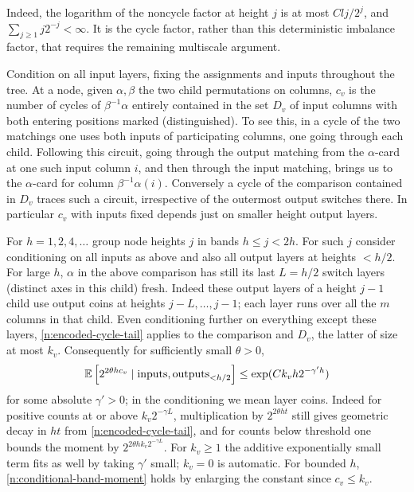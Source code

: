 Indeed, the logarithm of the noncycle factor at height $j$ is at
most $Clj/2^j$, and $\sum_{j\ge1}j2^{-j}<\infty$.
It is the cycle factor, rather than this deterministic imbalance
factor, that requires the remaining multiscale argument.

Condition on all input layers, fixing the assignments and inputs throughout the tree. At a node, given \(\alpha,\beta\) the two child permutations on columns, \(c_v\) is the number of cycles of \(\beta^{-1}\alpha\) entirely contained in the set \(D_v\) of input columns with both entering positions marked (distinguished). To see this, in a cycle of the two matchings one uses both inputs of participating columns, one going through each child. Following this circuit, going through the output matching from the \(\alpha\)-card at one such input column \(i\), and then through the input matching, brings us to the \(\alpha\)-card for column \(\beta^{-1}\alpha(i)\). Conversely a cycle of the comparison contained in \(D_v\) traces such a circuit, irrespective of the outermost output switches there. In particular \(c_v\) with inputs fixed depends just on smaller height output layers.

For \(h=1,2,4,\ldots\) group node heights \(j\) in bands \(h\le j<2h\). For such \(j\) consider conditioning on all inputs as above and also all output layers at heights \(<h/2\). For large \(h\), \(\alpha\) in the above comparison has still its last \(L=h/2\) switch layers (distinct axes in this child) fresh. Indeed these output layers of a height \(j-1\) child use output coins at heights \(j-L,\ldots,j-1\); each layer runs over all the \(m\) columns in that child. Even conditioning further on everything except these layers, \eqref{n:encoded-cycle-tail} applies to the comparison and \(D_v\), the latter of size at most \(k_v\). Consequently for sufficiently small \(\theta>0\),
\begin{equation}
\mathbb E\left[2^{2\theta h c_v}\mid {\rm inputs}, {\rm outputs}_{<h/2}\right]\le
\exp(C k_v h 2^{-\gamma' h})
\label{n:conditional-band-moment}
\end{equation}
for some absolute \(\gamma'>0\); in the conditioning we mean layer coins. Indeed for positive counts at or above \(k_v 2^{-\gamma L}\), multiplication by \(2^{2\theta h t}\) still gives geometric decay in \(ht\) from \eqref{n:encoded-cycle-tail}, and for counts below threshold one bounds the moment by \(2^{2\theta h k_v 2^{-\gamma L}}\). For \(k_v\ge1\) the additive exponentially small term fits as well by taking \(\gamma'\) small; \(k_v=0\) is automatic. For bounded \(h\), \eqref{n:conditional-band-moment} holds by enlarging the constant since \(c_v\le k_v\).

